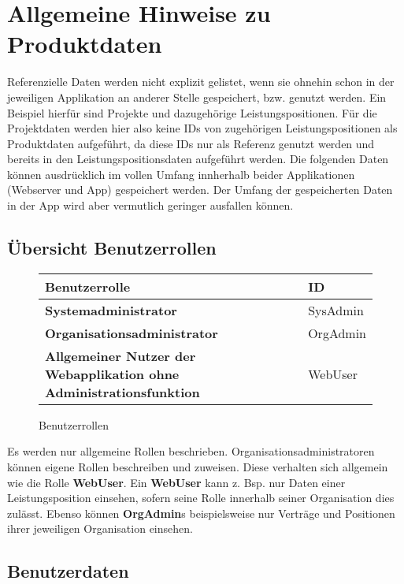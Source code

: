 \section{Allgemeine Hinweise zu Produktdaten}

Referenzielle Daten werden nicht explizit gelistet, wenn sie ohnehin schon in der jeweiligen Applikation an anderer Stelle gespeichert, bzw. genutzt werden.
Ein Beispiel hierfür sind Projekte und dazugehörige Leistungspositionen. Für die Projektdaten werden hier also keine IDs von zugehörigen Leistungspositionen
als Produktdaten aufgeführt, da diese IDs nur als Referenz genutzt werden und bereits in den Leistungspositionsdaten aufgeführt werden.
Die folgenden Daten können ausdrücklich im vollen Umfang innherhalb beider Applikationen (Webserver und App) gespeichert werden. Der Umfang der gespeicherten Daten in der App wird aber vermutlich geringer ausfallen können.

\subsection{Übersicht Benutzerrollen}

\begin{figure}[h]
	\centering
	\begin{tabularx}{\textwidth}{| X | X |}
        \hline
		\textbf{Benutzerrolle} & \textbf{ID} \\ \hline \hline
		\textbf{Systemadministrator} & SysAdmin \\ \hline
		\textbf{Organisationsadministrator} & OrgAdmin \\ \hline
        \textbf{Allgemeiner Nutzer der Webapplikation ohne Administrationsfunktion} & WebUser \\ \hline
	\end{tabularx}
	\caption{Benutzerrollen}
	\label{fig:Benutzerrollen}
\end{figure}

\begin{flushleft}
Es werden nur allgemeine Rollen beschrieben. Organisationsadministratoren können eigene Rollen beschreiben und zuweisen. Diese verhalten sich allgemein wie die Rolle \textbf{WebUser}.
Ein \textbf{WebUser} kann z. Bsp. nur Daten einer Leistungsposition einsehen, sofern seine Rolle innerhalb seiner Organisation dies zulässt. Ebenso können \textbf{OrgAdmin}s beispielsweise nur Verträge und
Positionen ihrer jeweiligen Organisation einsehen.
\end{flushleft}

\subsection{Benutzerdaten}

